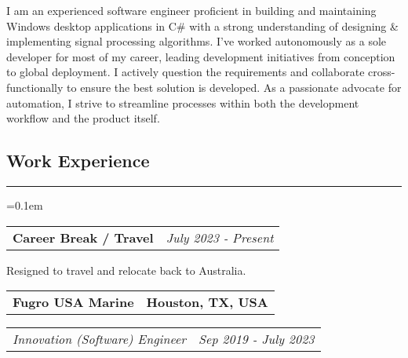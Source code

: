 \documentclass[10pt,letterpaper]{article}
\makeatletter
\newcommand{\headerrow}[2]
{\begin{tabular*}{\linewidth}{l@{\extracolsep{\fill}}r}
	#1 &
	#2 \\
\end{tabular*}}
\makeatother
\begin{document}

I am an experienced software engineer proficient in building and maintaining Windows desktop applications in C\# with a strong understanding of designing \& implementing signal processing algorithms. I’ve worked autonomously as a sole developer for most of my career, leading development initiatives from conception to global deployment. I actively question the requirements and collaborate cross-functionally to ensure the best solution is developed. As a  passionate advocate for automation, I strive to streamline processes within both the development workflow and the product itself.

\subsection*{Work Experience}
\vspace{-0.25em}
\hrule
\vspace{1em}
\parskip=0.1em

\headerrow
    {\textbf{Career Break / Travel}}
    {\textit{July 2023 - Present}}
    \begin{itemize*}
    \vspace{-0.5em}
    \item Resigned to travel and relocate back to Australia.  
        \end{itemize*}

\headerrow
    {\textbf{Fugro USA Marine}}
    {\textbf{Houston, TX, USA}}
	\headerrow
		{\emph{Innovation (Software) Engineer}}
		{\emph{Sep 2019 - July 2023}} \\
  
\end{document}
